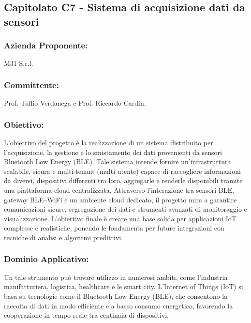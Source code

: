 \documentclass[a4paper,12pt]{article}
\begin{document}
\subsection{ Capitolato C7 - Sistema di acquisizione dati da sensori}
\subsubsection*{Azienda Proponente:} M31 S.r.l.
\subsubsection*{Committente:} Prof. Tullio Verdanega e Prof. Riccardo Cardin.
\subsubsection*{Obiettivo:} 
L’obiettivo del progetto è la realizzazione di un sistema distribuito per l’acquisizione, la gestione e lo smistamento dei dati provenienti da sensori Bluetooth Low Energy (BLE). Tale sistema intende fornire un’infrastruttura scalabile, sicura e multi-tenant (multi utente) capace di raccogliere informazioni da diversi, dispositivi differenti tra loro, aggregarle e renderle disponibili tramite una piattaforma cloud centralizzata.
Attraverso l’interazione tra sensori BLE, gateway BLE–WiFi e un ambiente cloud dedicato, il progetto mira a garantire comunicazioni sicure, segregazione dei dati e strumenti avanzati di monitoraggio e visualizzazione. L’obiettivo finale è creare una base solida per applicazioni IoT complesse e realistiche, ponendo le fondamenta per future integrazioni con tecniche di analisi e algoritmi predittivi.
\subsubsection*{Dominio Applicativo:} 
Un tale strumento può trovare utilizzo in numerosi ambiti, come l'industria manifatturiera, logistica, healthcare e le smart city. L’Internet of Things (IoT) si basa su tecnologie come il Bluetooth Low Energy (BLE), che consentono la raccolta di dati in modo efficiente e a basso consumo energetico, favorendo la cooperazione in tempo reale tra centinaia di dispositivi.
\end{document}

